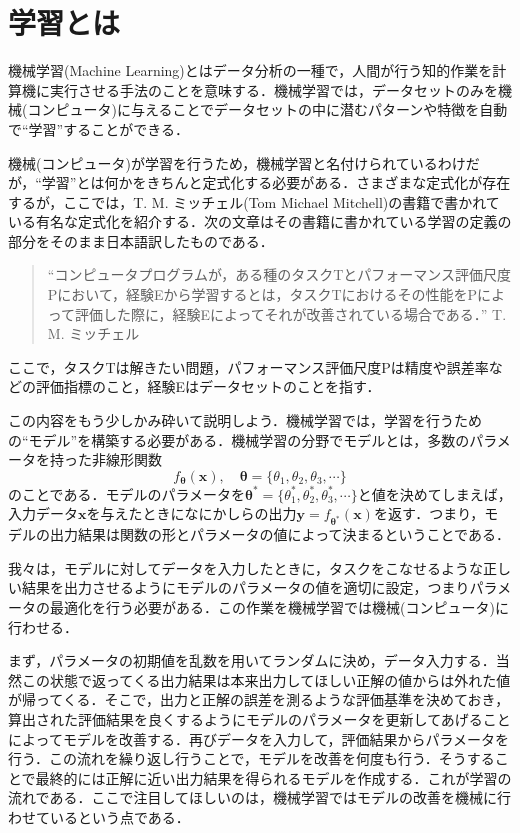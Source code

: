 \documentclass[a4paper,11pt]{jsreport}
\begin{document}
\section{学習とは}
機械学習(Machine Learning)とはデータ分析の一種で，人間が行う知的作業を計算機に実行させる手法のことを意味する．機械学習では，データセットのみを機械(コンピュータ)に与えることでデータセットの中に潜むパターンや特徴を自動で``学習''することができる．\par
機械(コンピュータ)が学習を行うため，機械学習と名付けられているわけだが，``学習''とは何かをきちんと定式化する必要がある．さまざまな定式化が存在するが，ここでは，T. M. ミッチェル(Tom Michael Mitchell)の書籍\cite{Tom1997Machine}で書かれている有名な定式化を紹介する．次の文章はその書籍に書かれている学習の定義の部分をそのまま日本語訳したものである．
\begin{quote}
  ``コンピュータプログラムが，ある種のタスクTとパフォーマンス評価尺度Pにおいて，経験Eから学習するとは，タスクTにおけるその性能をPによって評価した際に，経験Eによってそれが改善されている場合である．''
  \hfill T. M. ミッチェル
\end{quote}
ここで，タスクTは解きたい問題，パフォーマンス評価尺度Pは精度や誤差率などの評価指標のこと，経験Eはデータセットのことを指す．\par
この内容をもう少しかみ砕いて説明しよう．機械学習では，学習を行うための``モデル''を構築する必要がある．機械学習の分野でモデルとは，多数のパラメータを持った非線形関数
\begin{equation}
  f_{\bm{\theta}}(\bm{x}), \quad \bm{\theta} = \{ \theta_1, \theta_2, \theta_3, \cdots \}
\end{equation}
のことである．モデルのパラメータを$\bm{\theta}^* = \{ \theta_1^*, \theta_2^*, \theta_3^*, \cdots \}$と値を決めてしまえば，入力データ$\bm{x}$を与えたときになにかしらの出力$\bm{y}=f_{\bm{\theta}^*}(\bm{x})$を返す．つまり，モデルの出力結果は関数の形とパラメータの値によって決まるということである．\par
我々は，モデルに対してデータを入力したときに，タスクをこなせるような正しい結果を出力させるようにモデルのパラメータの値を適切に設定，つまりパラメータの最適化を行う必要がある．この作業を機械学習では機械(コンピュータ)に行わせる．\par
まず，パラメータの初期値を乱数を用いてランダムに決め，データ入力する．当然この状態で返ってくる出力結果は本来出力してほしい正解の値からは外れた値が帰ってくる．そこで，出力と正解の誤差を測るような評価基準を決めておき，算出された評価結果を良くするようにモデルのパラメータを更新してあげることによってモデルを改善する．再びデータを入力して，評価結果からパラメータを行う．この流れを繰り返し行うことで，モデルを改善を何度も行う．そうすることで最終的には正解に近い出力結果を得られるモデルを作成する．これが学習の流れである．ここで注目してほしいのは，機械学習ではモデルの改善を機械に行わせているという点である．\par
\end{document}
